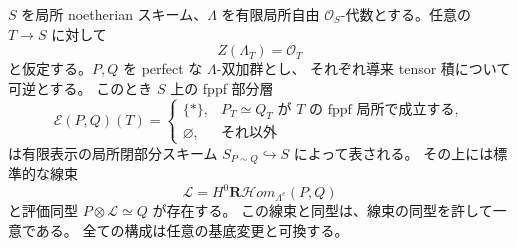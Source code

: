 \begin{theorem}
\label{thm:bimodule-line-comparison}
$S$ を局所 noetherian スキーム、$\Lambda$ を有限局所自由
$\mathcal O_S$-代数とする。任意の $T\to S$ に対して
\[
 Z(\Lambda_T)=\mathcal O_T
\]
と仮定する。$P,Q$ を perfect な $\Lambda$-双加群とし、
それぞれ導来 tensor 積について可逆とする。
このとき $S$ 上の fppf 部分層
\[
 \mathscr E(P,Q)(T)=
 \begin{cases}
 \{*\},&P_T\simeq Q_T\text{ が }T\text{ の fppf 局所で成立する},\\
 \varnothing,&\text{それ以外}
 \end{cases}
\]
は有限表示の局所閉部分スキーム $S_{P\sim Q}\hookrightarrow S$ によって表される。
その上には標準的な線束
\[
 \mathcal L=H^0\mathbf R\mathcal Hom_{\Lambda^e}(P,Q)
\]
と評価同型 $P\otimes\mathcal L\simeq Q$ が存在する。
この線束と同型は、線束の同型を許して一意である。
全ての構成は任意の基底変更と可換する。
\end{theorem}
